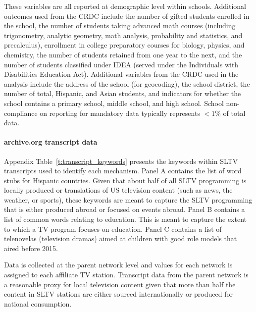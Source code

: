 \documentclass[11pt]{article}
\begin{document}
These variables are all reported at demographic level within schools. Additional outcomes used from the CRDC include the number of gifted students enrolled in the school, the number of students taking advanced math courses (including trigonometry, analytic geometry, math analysis, probability and statistics, and precalculus), enrollment in college preparatory courses for biology, physics, and chemistry, the number of students retained from one year to the next, and the number of students classified under IDEA (served under the Individuals with Disabilities Education Act). Additional variables from the CRDC used in the analysis include the address of the school (for geocoding), the school district, the number of total, Hispanic, and Asian students, and indicators for whether the school contains a primary school, middle school, and high school. School non-compliance on reporting for mandatory data typically represents $<1\%$ of total data.





\paragraph{archive.org transcript data} 
Appendix Table~\ref{t:transcript_keywords} presents the keywords within SLTV transcripts used to identify each mechanism.  Panel A contains the list of word stubs for Hispanic countries. Given that about half of all SLTV programming is locally produced or translations of US television content (such as news, the weather, or sports), these keywords are meant to capture the SLTV programming that is either produced abroad or focused on events abroad. Panel B contains a list of common words relating to education. This is meant to capture the extent to which a TV program focuses on education. Panel C contains a list of telenovelas (television dramas) aimed at children with good role models that aired before 2015. 

Data is collected at the parent network level and values for each network is assigned to each affiliate TV station. Transcript data from the parent network is a reasonable proxy for local television content given that more than half the content in SLTV stations are either sourced internationally or produced for national consumption. 
\end{document}
